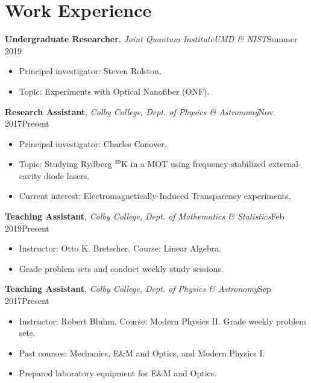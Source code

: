\documentclass[a4paper, 10.5pt]{article}
\begin{document}
	\section*{\normalsize{{\color{colby}\textbf{Work Experience}}}}
	\textbf{Undergraduate Researcher},  \textit{Joint Quantum Institute\textemdash UMD \&  NIST}\hfill Summer 2019
	\begin{itemize}[noitemsep, nolistsep]
		\setlength{\itemindent}{0.2in}
		\item Principal investigator: Steven Rolston.
		\item Topic: Experiments with Optical Nanofiber (ONF). \\
	\end{itemize}
	\indent \indent \textbf{Research Assistant}, \textit{Colby College, Dept. of Physics \& Astronomy}\hfill Nov 2017\textemdash Present
	\begin{itemize}[noitemsep, nolistsep]
		\setlength{\itemindent}{0.2in}
		\item Principal investigator: Charles Conover.
		\item Topic: Studying Rydberg $^{\text{39}}$K in a MOT using frequency-stabilized external-cavity diode lasers.
		\item Current interest: Electromagnetically-Induced Transparency experiments.\\
	\end{itemize}	
	\indent \indent \textbf{Teaching Assistant}, \textit{Colby College, Dept. of Mathematics \& Statistics}\hfill Feb 2019\textemdash Present 
	\begin{itemize}[noitemsep, nolistsep]
		\setlength{\itemindent}{0.2in}
		\item Instructor: Otto K. Bretscher. Course: Linear Algebra.
		\item Grade problem sets and conduct weekly study sessions. \\
	\end{itemize}
	\indent \indent \textbf{Teaching Assistant}, \textit{Colby College, Dept. of Physics \& Astronomy}\hfill Sep 2017\textemdash Present
	\begin{itemize}[noitemsep, nolistsep]
		\setlength{\itemindent}{0.2in}
		\item Instructor: Robert Bluhm. Course: Modern Physics II. Grade weekly problem sets.
		\item Past courses: Mechanics, E\&M and Optics, and Modern Physics I.
		\item Prepared laboratory equipment for E\&M and Optics.\\
	\end{itemize}
\end{document}
